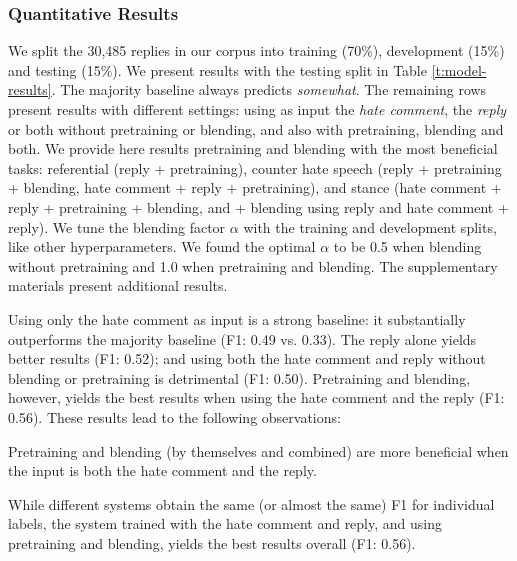 \documentclass[11pt]{article}
\begin{document}
\subsubsection{Quantitative Results}
We split the 30,485 replies in our corpus into training (70\%), development (15\%) and testing (15\%).
We present results with the testing split in Table \ref{t:model-results}.
The majority baseline always predicts \emph{somewhat}.
The remaining rows present results with different settings:
using as input the \emph{hate comment}, the \emph{reply} or both without pretraining or blending, and also with
pretraining, blending and both.
We provide here results pretraining and blending with the most beneficial tasks:
referential (reply + pretraining),
counter hate speech (reply + pretraining + blending, hate comment + reply + pretraining),
and stance (hate comment + reply + pretraining + blending, and  + blending using reply and hate comment + reply).
We tune the blending factor $\alpha$  with the training and development splits, like other hyperparameters.
We found the optimal $\alpha$ to be 0.5 when blending without pretraining and 1.0 when pretraining and blending. 
The supplementary materials present additional results.

Using only the hate comment as input is a strong baseline: it substantially outperforms the majority baseline (F1: 0.49 vs. 0.33).
The reply alone yields better results (F1: 0.52);
and using both the hate comment and reply without blending or pretraining is detrimental (F1: 0.50).
Pretraining and blending, however, yields the best results when using the hate comment and the reply (F1: 0.56).
These results lead to the following observations:
\begin{compactitem}
	\item Pretraining and blending (by themselves and combined) are more beneficial when the input is both the hate comment and the reply.
	\item While different systems obtain the same (or almost the same) F1 for individual labels,
	the system trained with the hate comment and reply, and using pretraining and blending, yields the best results overall (F1: 0.56).
\end{compactitem}


\end{document}
